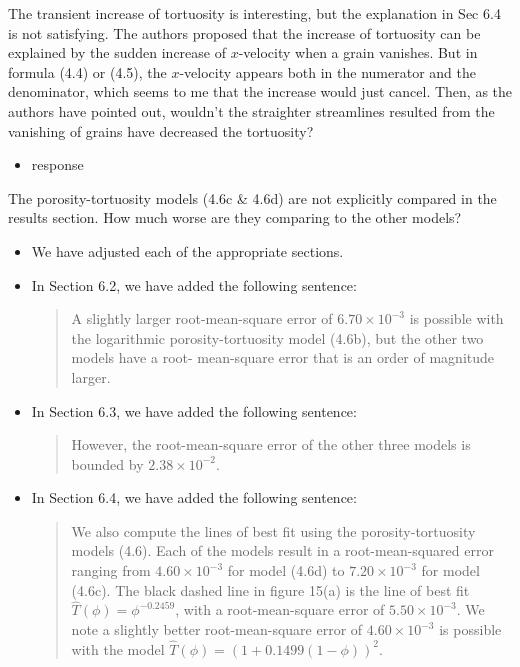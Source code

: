 \documentclass[11pt]{article}
\newcommand{\comment}[1]{{\color{blue} #1}}
\begin{document}
\noindent
\comment{The transient increase of tortuosity is interesting, but the
explanation in Sec 6.4 is not satisfying. The authors proposed that the
increase of tortuosity can be explained by the sudden increase of
$x$-velocity when a grain vanishes. But in formula (4.4) or (4.5), the
$x$-velocity appears both in the numerator and the denominator, which
seems to me that the increase would just cancel. Then, as the authors
have pointed out, wouldn't the straighter streamlines resulted from the
vanishing of grains have decreased the tortuosity?}
\begin{itemize}
  \item response
\end{itemize}

\noindent
\comment{The porosity-tortuosity models (4.6c \& 4.6d) are not
explicitly compared in the results section. How much worse are they
comparing to the other models?}
\begin{itemize}
  \item We have adjusted each of the appropriate sections.

  \item In Section 6.2, we have added the following sentence:
    \begin{quotation}
      \noindent
      A slightly larger root-mean-square error of $6.70 \times 10^{-3}$
      is possible with the logarithmic porosity-tortuosity model (4.6b),
      but the other two models have a root- mean-square error that is an
      order of magnitude larger.
    \end{quotation}


  \item In Section 6.3, we have added the following sentence:
    \begin{quotation}
      \noindent
      However, the root-mean-square error of the other three models is
      bounded by $2.38 \times 10^{-2}$.
    \end{quotation}

  \item In Section 6.4, we have added the following sentence:
    \begin{quotation}
      \noindent
      We also compute the lines of best fit using the
      porosity-tortuosity models (4.6).  Each of the models result in a
      root-mean-squared error ranging from $4.60 \times 10^{-3}$ for
      model (4.6d) to $7.20 \times 10^{-3}$ for model (4.6c). The black
      dashed line in figure 15(a) is the line of best fit
      $\widehat{T}(\phi) = \phi^{-0.2459}$, with a root-mean-square
      error of $5.50 \times 10^{-3}$.  We note a slightly better
      root-mean-square error of $4.60 \times 10^{-3}$ is possible with
      the model $\widehat{T}(\phi) = \left(1 + 0.1499(1-\phi)\right)^2$.
    \end{quotation}

\end{itemize}
\end{document}
